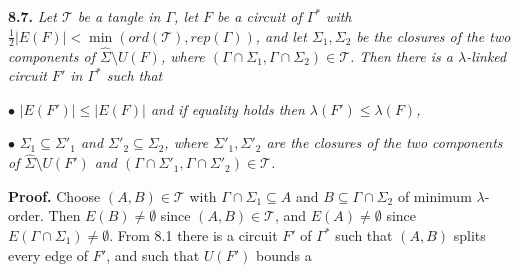 \textbf{8.7.} \textit{Let $\mathscr{T}$ be a tangle in $\Gamma$, let $F$ be a circuit of $\Gamma^*$ with $\frac{1}{2} |E(F)| < \min(ord(\mathscr{T}), rep(\Gamma))$, and let $\Sigma_1, \Sigma_2$ be the closures of the two components of $\hat{\Sigma} \setminus U(F)$, where $(\Gamma \cap \Sigma_1, \Gamma \cap \Sigma_2) \in \mathscr{T}$. Then there is a $\lambda$-linked circuit $F'$ in $\Gamma^*$ such that}

\hspace*{12pt}$\bullet$ \textit{$|E(F')| \le |E(F)|$ and if equality holds then $\lambda(F') \le \lambda(F)$,}

\hspace*{12pt}$\bullet$ \textit{$\Sigma_1 \subseteq \Sigma'_1$ and $\Sigma'_2 \subseteq \Sigma_2$, where $\Sigma'_1, \Sigma'_2$ are the closures of the two components of $\hat{\Sigma} \setminus U(F')$ and $(\Gamma \cap \Sigma'_1, \Gamma \cap \Sigma'_2) \in \mathscr{T}$.}

\textbf{Proof.} Choose $(A, B) \in \mathscr{T}$ with $\Gamma \cap \Sigma_1 \subseteq A$ and $B \subseteq \Gamma \cap \Sigma_2$ of minimum $\lambda$-order. Then $E(B) \ne \emptyset$ since $(A, B) \in \mathscr{T}$, and $E(A) \ne \emptyset$ since $E(\Gamma \cap \Sigma_1) \ne \emptyset$. From 8.1 there is a circuit $F'$ of $\Gamma^*$ such that $(A, B)$ splits every edge of $F'$, and such that $U(F')$ bounds a
